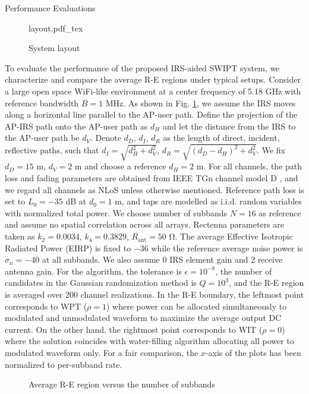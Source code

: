 \documentclass{IEEEtran}
\begin{document}
\begin{section}{Performance Evaluations}
	\begin{figure}
		\centering
		\def\svgwidth{\columnwidth}
		{layout.pdf_tex}
		\caption{System layout}
		\label{fi:layout}
	\end{figure}
	To evaluate the performance of the proposed IRS-aided SWIPT system, we characterize and compare the average R-E regions under typical setups. Consider a large open space WiFi-like environment at a center frequency of 5.18 \si{\GHz} with reference bandwidth $B=1$ \si{\MHz}. As shown in Fig. \ref{fi:layout}, we assume the IRS moves along a horizontal line parallel to the AP-user path. Define the projection of the AP-IRS path onto the AP-user path as $d_H$ and let the distance from the IRS to the AP-user path be $d_V$. Denote $d_D$, $d_I$, $d_R$ as the length of direct, incident, reflective paths, such that $d_I=\sqrt{d_H^2+d_V^2}$, $d_R=\sqrt{(d_D-d_H)^2+d_V^2}$. We fix $d_D=15$ \si{\meter}, $d_V=2$ \si{\meter} and choose a reference $d_H=2$ \si{\meter}. For all channels, the path loss and fading parameters are obtained from IEEE TGn channel model D \cite{Erceg2004}, and we regard all channels as NLoS unless otherwise mentioned. Reference path loss is set to $L_0=-35$ \si{\dB} at $d_0=1$ \si{\meter}, and taps are modelled as i.i.d. random variables with normalized total power. We choose number of subbands $N=16$ as reference and assume no spatial correlation across all arrays. Rectenna parameters are taken as $k_2=0.0034$, $k_4=0.3829$, $R_{\text{ant}}=50$ \si{\ohm}. The average Effective Isotropic Radiated Power (EIRP) is fixed to $-36$ \si{\dBi} while the reference average noise power is $\sigma_n=-40$ \si{\dBm} at all subbands. We also assume 0 \si{\dBi} IRS element gain and 2 \si{\dBi} receive antenna gain. For the algorithm, the tolerance is $\epsilon=10^{-8}$, the number of candidates in the Gaussian randomization method is $Q=10^{3}$, and the R-E region is averaged over 200 channel realizations. In the R-E boundary, the leftmost point corresponds to WPT ($\rho=1$) where power can be allocated simultaneously to modulated and unmodulated waveform to maximize the average output DC current. On the other hand, the rightmost point corresponds to WIT ($\rho=0$) where the solution coincides with water-filling algorithm allocating all power to modulated waveform only. For a fair comparison, the $x$-axis of the plots has been normalized to per-subband rate.

	\begin{figure}
		\centering
		\begin{adjustbox}{width=\linewidth}
			
		\end{adjustbox}
		\caption{Average R-E region versus the number of subbands}
		\label{fi:re_subband}
	\end{figure}


\end{section}
\end{document}
